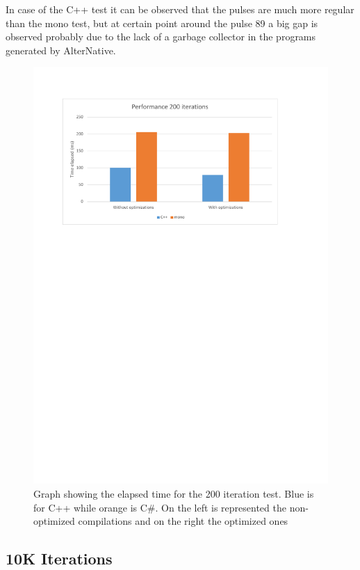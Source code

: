 In case of the C++ test it can be observed that the pulses are much more regular than the mono test, but at certain point around the pulse 89 a big gap is observed probably due to the lack of a garbage collector in the programs generated by AlterNative.

\begin{figure}[H]\begin{center}
 \centering
  \captionsetup{justification=centering}
  \includegraphics[scale=0.9,page=1]{pictures/performance-tests/GPIO/graphs}
  \caption{Graph showing the elapsed time for the 200 iteration test. Blue is for C++ while orange is C\#. On the left is represented the non-optimized compilations and on the right the optimized ones\label{fig:gpio-graph-200}}
\end{center}\end{figure}

\subsection{10K Iterations}\label{SS:10K-iterations}

